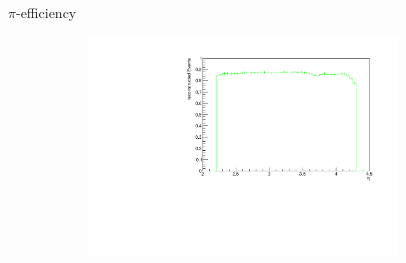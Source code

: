 \documentclass[11pt]{beamer}
\begin{document}
\begin{frame}{$\pi$-efficiency}
\begin{figure}
\begin{subfigure}{0.45\textwidth}
\end{subfigure}
\begin{subfigure}{0.45\textwidth}
\includegraphics[width=0.9\textwidth]{up_pdf/single/tot/h_eta_reco_Pi.pdf}
\end{subfigure}
\end{figure}
\end{frame}
\end{document}
